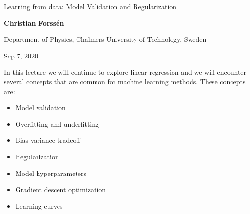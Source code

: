 \documentclass[%
oneside,                 %
final,                   %
10pt]{article}
\begin{document}

\newcommand{\exercisesection}[1]{\subsection*{#1}}







\thispagestyle{empty}

\begin{center}
{\LARGE\bf
\begin{spacing}{1.25}
Learning from data: Model Validation and Regularization
\end{spacing}
}
\end{center}


\begin{center}
{\bf Christian Forssén}
\end{center}

    \begin{center}
\centerline{{\small Department of Physics, Chalmers University of Technology, Sweden}}
\end{center}
    

\begin{center}
Sep 7, 2020
\end{center}

\vspace{1cm}


In this lecture we will continue to explore linear regression and we will encounter several concepts that are common for machine learning methods. These concepts are:
\begin{itemize}
  \item Model validation

  \item Overfitting and underfitting

  \item Bias-variance-tradeoff

  \item Regularization

  \item Model hyperparameters

  \item Gradient descent optimization

  \item Learning curves
\end{itemize}
\end{document}
